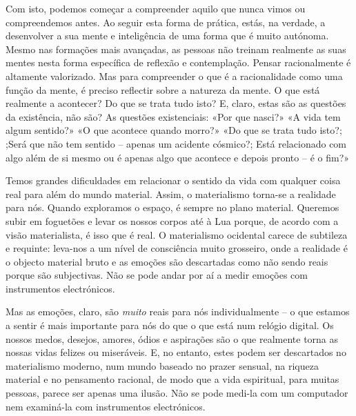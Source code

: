 Com isto, podemos começar a compreender aquilo que nunca vimos ou compreendemos
antes. Ao seguir esta forma de prática, estás, na verdade, a desenvolver a sua
mente e inteligência de uma forma que é muito autónoma. Mesmo nas formações mais
avançadas, as pessoas não treinam realmente as suas mentes nesta forma
específica de reflexão e contemplação. Pensar racionalmente é altamente
valorizado. Mas para compreender o que é a racionalidade como uma função da
mente, é preciso reflectir sobre a natureza da mente. O que está realmente a
acontecer? Do que se trata tudo isto? E, claro, estas são as questões da
existência, não são? As questões existenciais: «Por que nasci?» «A vida tem
algum sentido?» «O que acontece quando morro?» «Do que se trata tudo isto?;
;Será que não tem sentido -- apenas um acidente cósmico?; Está relacionado com
algo além de si mesmo ou é apenas algo que acontece e depois pronto -- é o fim?»

Temos grandes dificuldades em relacionar o sentido da vida com qualquer coisa
real para além do mundo material. Assim, o materialismo torna-se a realidade
para nós. Quando exploramos o espaço, é sempre no plano material. Queremos subir
em foguetões e levar os nossos corpos até à Lua porque, de acordo com a visão
materialista, é isso que é real. O materialismo ocidental carece de subtileza e
requinte: leva-nos a um nível de consciência muito grosseiro, onde a realidade
é o objecto material bruto e as emoções são descartadas como não sendo reais
porque são subjectivas. Não se pode andar por aí a medir emoções com
instrumentos electrónicos.

Mas as emoções, claro, são \emph{muito} reais para nós individualmente -- o que
estamos a sentir é mais importante para nós do que o que está num relógio
digital. Os nossos medos, desejos, amores, ódios e aspirações são o que
realmente torna as nossas vidas felizes ou miseráveis. E, no entanto, estes
podem ser descartados no materialismo moderno, num mundo baseado no prazer
sensual, na riqueza material e no pensamento racional, de modo que a vida
espiritual, para muitas pessoas, parece ser apenas uma ilusão. Não se pode
medi-la com um computador nem examiná-la com instrumentos electrónicos.

